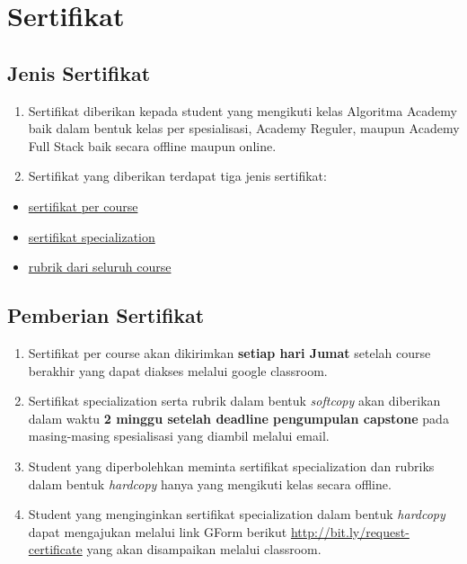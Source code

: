 \documentclass[
]{book}
\providecommand{\tightlist}{%
  \setlength{\itemsep}{0pt}\setlength{\parskip}{0pt}}
\begin{document}
\hypertarget{sertifikat}{%
\section{Sertifikat}\label{sertifikat}}

\hypertarget{jenis-sertifikat}{%
\subsection{Jenis Sertifikat}\label{jenis-sertifikat}}

\begin{enumerate}
\def\labelenumi{\arabic{enumi}.}
\tightlist
\item
  Sertifikat diberikan kepada student yang mengikuti kelas Algoritma Academy baik dalam bentuk kelas per spesialisasi, Academy Reguler, maupun Academy Full Stack baik secara offline maupun online.
\item
  Sertifikat yang diberikan terdapat tiga jenis sertifikat:
\end{enumerate}

\begin{itemize}
\tightlist
\item
  \href{https://drive.google.com/file/d/1r_nST2hqB02afh3cMV1EypkxDvGab6WV/view?usp=sharing}{sertifikat per course}
\item
  \href{https://drive.google.com/file/d/1m9CuUjAnWCspSyKGSmvmPc7eabCg_KWS/view?usp=sharing}{sertifikat specialization}
\item
  \href{https://drive.google.com/file/d/11joZCgOGWZqxQTAjVaOMNy9ct1U4h5-P/view?usp=sharing}{rubrik dari seluruh course}
\end{itemize}

\hypertarget{pemberian-sertifikat}{%
\subsection{Pemberian Sertifikat}\label{pemberian-sertifikat}}

\begin{enumerate}
\def\labelenumi{\arabic{enumi}.}
\tightlist
\item
  Sertifikat per course akan dikirimkan \textbf{setiap hari Jumat} setelah course berakhir yang dapat diakses melalui google classroom.
\item
  Sertifikat specialization serta rubrik dalam bentuk \emph{softcopy} akan diberikan dalam waktu \textbf{2 minggu setelah deadline pengumpulan capstone} pada masing-masing spesialisasi yang diambil melalui email.
\item
  Student yang diperbolehkan meminta sertifikat specialization dan rubriks dalam bentuk \emph{hardcopy} hanya yang mengikuti kelas secara offline.\\
\item
  Student yang menginginkan sertifikat specialization dalam bentuk \emph{hardcopy} dapat mengajukan melalui link GForm berikut \url{http://bit.ly/request-certificate} yang akan disampaikan melalui classroom.
\end{enumerate}
\end{document}
